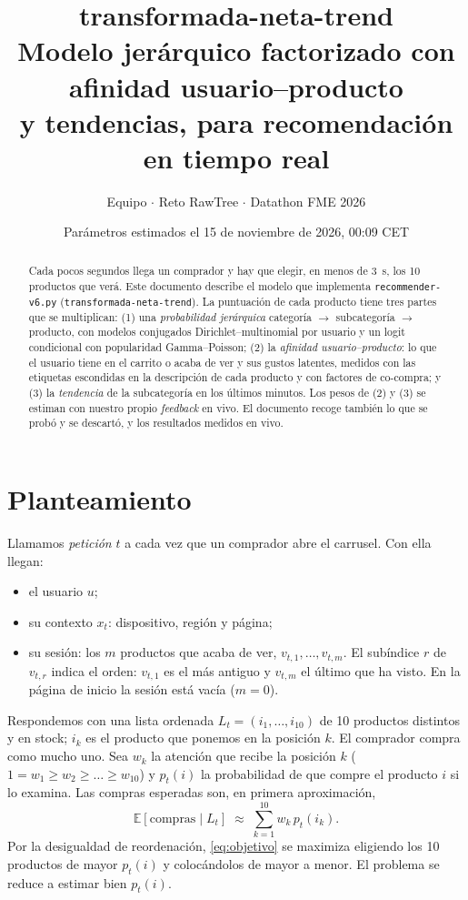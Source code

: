 \documentclass[11pt,a4paper]{article}
\title{\textbf{transformada-neta-trend}\\[0.3em]
\large Modelo jerárquico factorizado con afinidad usuario--producto\\ y tendencias, para recomendación en tiempo real}
\author{Equipo \cod{team\_03} $\cdot$ Reto RawTree $\cdot$ Datathon FME 2026}
\date{Parámetros estimados el 15 de noviembre de 2026, 00:09 CET}
\newcommand{\E}{\mathbb{E}}
\newcommand{\cod}[1]{\texttt{#1}}
\begin{document}
\maketitle

\begin{abstract}
\noindent Cada pocos segundos llega un comprador y hay que elegir, en menos de 3~s, los 10 productos
que verá. Este documento describe el modelo que implementa \cod{recommender-v6.py}
(\cod{transformada-neta-trend}). La puntuación de cada producto tiene tres partes que se multiplican:
(1) una \emph{probabilidad jerárquica} categoría $\to$ subcategoría $\to$ producto, con modelos conjugados
Dirichlet--multinomial por usuario y un logit condicional con popularidad Gamma--Poisson; (2) la
\emph{afinidad usuario--producto}: lo que el usuario tiene en el carrito o acaba de ver y sus gustos
latentes, medidos con las etiquetas escondidas en la descripción de cada producto y con factores de
co-compra; y (3) la \emph{tendencia} de la subcategoría en los últimos minutos. Los pesos de (2) y (3) se
estiman con nuestro propio \emph{feedback} en vivo. El documento recoge también lo que se probó y se
descartó, y los resultados medidos en vivo.
\end{abstract}

\section{Planteamiento}

Llamamos \emph{petición} $t$ a cada vez que un comprador abre el carrusel. Con ella llegan:
\begin{itemize}\setlength{\itemsep}{0.1em}
\item el usuario $u$;
\item su contexto $x_t$: dispositivo, región y página;
\item su sesión: los $m$ productos que acaba de ver, $v_{t,1},\dots,v_{t,m}$. El subíndice $r$ de
$v_{t,r}$ indica el orden: $v_{t,1}$ es el más antiguo y $v_{t,m}$ el último que ha visto. En la página
de inicio la sesión está vacía ($m=0$).
\end{itemize}
Respondemos con una lista ordenada $L_t=(i_1,\dots,i_{10})$ de 10 productos distintos y en stock; $i_k$
es el producto que ponemos en la posición $k$. El comprador compra como mucho uno. Sea $w_k$ la atención
que recibe la posición $k$ ($1=w_1\ge w_2\ge\dots\ge w_{10}$) y $p_t(i)$ la probabilidad de que compre
el producto $i$ si lo examina. Las compras esperadas son, en primera aproximación,
\begin{equation}
\E[\text{compras}\mid L_t] \;\approx\; \sum_{k=1}^{10} w_k\, p_t(i_k). \label{eq:objetivo}
\end{equation}
Por la desigualdad de reordenación, \eqref{eq:objetivo} se maximiza eligiendo los 10 productos de
mayor $p_t(i)$ y colocándolos de mayor a menor. El problema se reduce a estimar bien $p_t(i)$.
\end{document}

